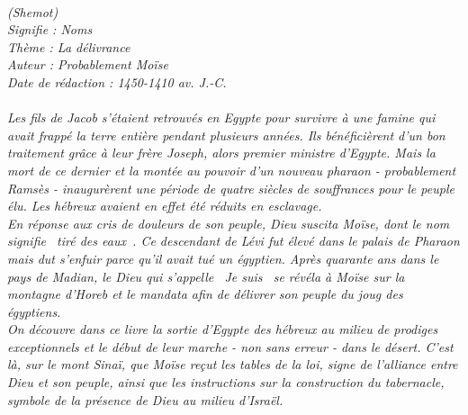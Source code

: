\BFont
\noindent\hrulefill
\textit{
\bigskip
{\centering{}
\\(Shemot)
\\Signifie : Noms
\\Thème : La délivrance
\\Auteur : Probablement Moïse
\\Date de rédaction : 1450-1410 av. J.-C.\\}
}
\textit{
\\Les fils de Jacob s’étaient retrouvés en Egypte pour survivre à une famine qui avait frappé la terre entière pendant plusieurs années. Ils bénéficièrent d’un bon traitement grâce à leur frère Joseph, alors premier ministre d’Egypte. Mais la mort de ce dernier et la montée au pouvoir d’un nouveau pharaon - probablement Ramsès - inaugurèrent une période de quatre siècles de souffrances pour le peuple élu. Les hébreux avaient en effet été réduits en esclavage.
\bigskip
\\En réponse aux cris de douleurs de son peuple, Dieu suscita Moïse, dont le nom signifie ~tiré des eaux~. Ce descendant de Lévi fut élevé dans le palais de Pharaon mais dut s’enfuir parce qu’il avait tué un égyptien. Après quarante ans dans le pays de Madian, le Dieu qui s’appelle ~Je suis~ se révéla à Moïse sur la montagne d’Horeb et le mandata afin de délivrer son peuple du joug des égyptiens.
\bigskip
\\On découvre dans ce livre la sortie d’Egypte des hébreux au milieu de prodiges exceptionnels et le début de leur marche - non sans erreur - dans le désert. C’est là, sur le mont Sinaï, que Moïse reçut les tables de la loi, signe de l’alliance entre Dieu et son peuple, ainsi que les instructions sur la construction du tabernacle, symbole de la présence de Dieu au milieu d’Israël.\bigskip
}
\par\nobreak\noindent\hrulefill
